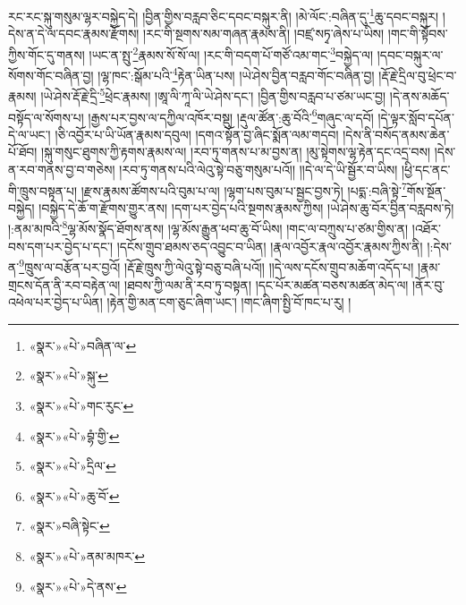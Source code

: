 རང་རང་སྐུ་གསུམ་ལྷར་བསྐྱེད་དེ། །བྱིན་གྱིས་བརླབ་ཅིང་དབང་བསྐུར་ནི། །མེ་ལོང་:བཞིན་དུ་\footnote{«སྣར་»«པེ་»བཞིན་ལ་}ཆུ་དབང་བསྐུར། །དེས་ན་དེ་ལ་དབང་རྣམས་རྫོགས། །རང་གི་སྔགས་སམ་གཞན་རྣམས་ནི། །བཛྲ་སཏྭ་ཞེས་པ་ཡིས། །གང་གི་སྟོབས་ཀྱིས་གོང་དུ་གནས། །ཡང་ན་སྤུ་\footnote{«སྣར་»«པེ་»སྐུ་}རྣམས་སོ་སོ་ལ། །རང་གི་བདག་པོ་གཙོ་འམ་གང་\footnote{«སྣར་»«པེ་»གང་རུང་}བསྐྱེད་ལ། །དབང་བསྐུར་ལ་སོགས་གོང་བཞིན་བྱ། །ལྷ་ཁང་:སྒོམ་པའི་\footnote{«སྣར་»«པེ་»བྷཾ་གྱི་}རྟེན་ཡིན་པས། །ཡེ་ཤེས་བྱིན་བརླབ་གོང་བཞིན་བྱ། །རྡོ་རྗེ་དྲིལ་བུ་ཕྲེང་བ་རྣམས། །ཡེ་ཤེས་རྡོ་རྗེ་དྲི་\footnote{«སྣར་»«པེ་»དྲིལ་}ཕྲེང་རྣམས། །ཨཱ་ལི་ཀཱ་ལི་ཡེ་ཤེས་དང་། །བྱིན་གྱིས་བརླབ་པ་ཙམ་ཡང་བྱ། །དེ་ནས་མཆོད་བསྟོད་ལ་སོགས་པ། །རྒྱས་པར་བྱས་ལ་དཀྱིལ་འཁོར་བསྡུ། །རྡུལ་ཚོན་:ཆུ་བོའི་\footnote{«སྣར་»«པེ་»ཆུ་བོ་}གཞུང་ལ་དབོ། །དེ་ལྟར་སློབ་དཔོན་དེ་ལ་ཡང་། །ཅི་འབྱོར་པ་ཡི་ཡོན་རྣམས་དབུལ། །དགའ་སྟོན་བྱ་ཞིང་སྨོན་ལམ་གདབ། །དེས་ནི་བསོད་ནམས་ཆེན་པོ་ཐོབ། །སྐུ་གསུང་ཐུགས་ཀྱི་རྟགས་རྣམས་ལ། །རབ་ཏུ་གནས་པ་མ་བྱས་ན། །མུ་སྟེགས་ལྷ་རྟེན་དང་འདྲ་བས། །དེས་ན་རབ་གནས་བྱ་བ་གཅེས། །རབ་ཏུ་གནས་པའི་ལེའུ་སྟེ་བཅུ་གསུམ་པའོ།། །།དེ་ལ་དེ་ཡི་སྦྱོར་བ་ཡིས། །ཕྱི་དང་ནང་གི་ཁྲུས་བསྟན་པ། །རྫས་རྣམས་ཚོགས་པའི་བུམ་པ་ལ། །ལྷག་པས་བུམ་པ་སྦྱང་བྱས་ཏེ། །པདྨ་:བཞི་སྟེ་\footnote{«སྣར་»བཞི་སྟེང་}གོས་སྔོན་བསྐྱེད། །བསྐྱེད་དེ་ཆོ་ག་རྫོགས་གྱུར་ནས། །དག་པར་བྱེད་པའི་སྔགས་རྣམས་ཀྱིས། །ཡེ་ཤེས་ཆུ་བོར་བྱིན་བརླབས་ཏེ། །:ནམ་མཁའི་\footnote{«སྣར་»«པེ་»ནམ་མཁར་}ལྷ་མོས་སྣོད་ཐོགས་ནས། །ལྷ་མོས་རྒྱུན་ཕབ་ཆུ་བོ་ཡིས། །གང་ལ་བཀྲུས་པ་ཙམ་གྱིས་ན། །འཐོར་བས་དག་པར་བྱེད་པ་དང་། །དངོས་གྲུབ་ཐམས་ཅད་འབྱུང་བ་ཡིན། །རྣལ་འབྱོར་རྣལ་འབྱོར་རྣམས་ཀྱིས་ནི། །:དེས་ན་\footnote{«སྣར་»«པེ་»དེ་ནས་}ཁྲུས་ལ་བརྩོན་པར་བྱའོ། །རྡོ་རྗེ་ཁྲུས་ཀྱི་ལེའུ་སྟེ་བཅུ་བཞི་པའོ།། །།དེ་ལས་དངོས་གྲུབ་མཆོག་འདོད་པ། །རྣམ་གྲངས་དོན་ནི་རབ་བརྟེན་ལ། །ཐབས་ཀྱི་ལམ་ནི་རབ་ཏུ་བསྟན། །དང་པོར་མཚན་བཅས་མཚན་མེད་ལ། །ནོར་བུ་འཕེལ་པར་བྱེད་པ་ཡིན། །རྟེན་གྱི་མན་ངག་ཅུང་ཞིག་ཡང་། །གང་ཞིག་སྤྱི་བོ་ཁང་པ་རུ། །
